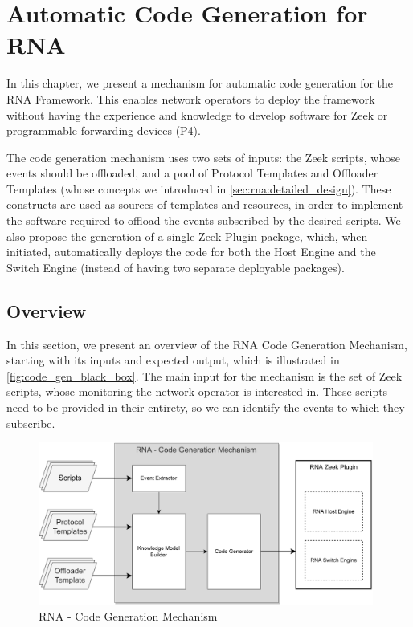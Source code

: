 \chapter{Automatic Code Generation for RNA}
\label{cap:code_gen}

In this chapter, we present a mechanism for automatic code generation for the RNA Framework. This enables network operators to deploy the framework without having the experience and knowledge to develop software for Zeek or programmable forwarding devices (P4).

The code generation mechanism uses two sets of inputs: the Zeek scripts, whose events should be offloaded, and a pool of Protocol Templates and Offloader Templates (whose concepts we introduced in \autoref{sec:rna:detailed_design}). These constructs are used as sources of templates and resources, in order to implement the software required to offload the events subscribed by the desired scripts. We also propose the generation of a single Zeek Plugin package, which, when initiated, automatically deploys the code for both the Host Engine and the Switch Engine (instead of having two separate deployable packages).


\section{Overview}
\label{sec:code_gen:overview}

In this section, we present an overview of the RNA Code Generation Mechanism, starting with its inputs and expected output, which is illustrated in \autoref{fig:code_gen_black_box}. The main input for the mechanism is the set of Zeek scripts, whose monitoring the network operator is interested in. These scripts need to be provided in their entirety, so we can identify the events to which they subscribe.

\begin{figure}[htb]
    \caption{RNA - Code Generation Mechanism}
    \begin{center}
        \includegraphics[width=0.98\textwidth]{images/code_gen_mechanism.pdf}
    \end{center}
    \label{fig:code_gen_black_box}
\end{figure}

